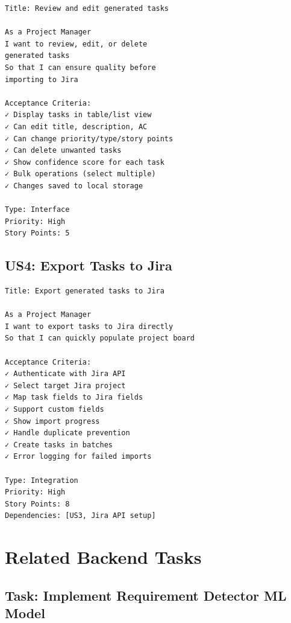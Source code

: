 \documentclass[12pt, a4paper]{report}
\begin{document}
\begin{tcolorbox}[colback=yellow!5, colframe=yellow!50]
\begin{lstlisting}
Title: Review and edit generated tasks

As a Project Manager
I want to review, edit, or delete 
generated tasks
So that I can ensure quality before 
importing to Jira

Acceptance Criteria:
✓ Display tasks in table/list view
✓ Can edit title, description, AC
✓ Can change priority/type/story points
✓ Can delete unwanted tasks
✓ Show confidence score for each task
✓ Bulk operations (select multiple)
✓ Changes saved to local storage

Type: Interface
Priority: High
Story Points: 5
\end{lstlisting}
\end{tcolorbox}

\subsection{US4: Export Tasks to Jira}

\begin{tcolorbox}[colback=purple!5, colframe=purple!50]
\begin{lstlisting}
Title: Export generated tasks to Jira

As a Project Manager
I want to export tasks to Jira directly
So that I can quickly populate project board

Acceptance Criteria:
✓ Authenticate with Jira API
✓ Select target Jira project
✓ Map task fields to Jira fields
✓ Support custom fields
✓ Show import progress
✓ Handle duplicate prevention
✓ Create tasks in batches
✓ Error logging for failed imports

Type: Integration
Priority: High
Story Points: 8
Dependencies: [US3, Jira API setup]
\end{lstlisting}
\end{tcolorbox}

\section{Related Backend Tasks}

\subsection{Task: Implement Requirement Detector ML Model}
\end{document}

